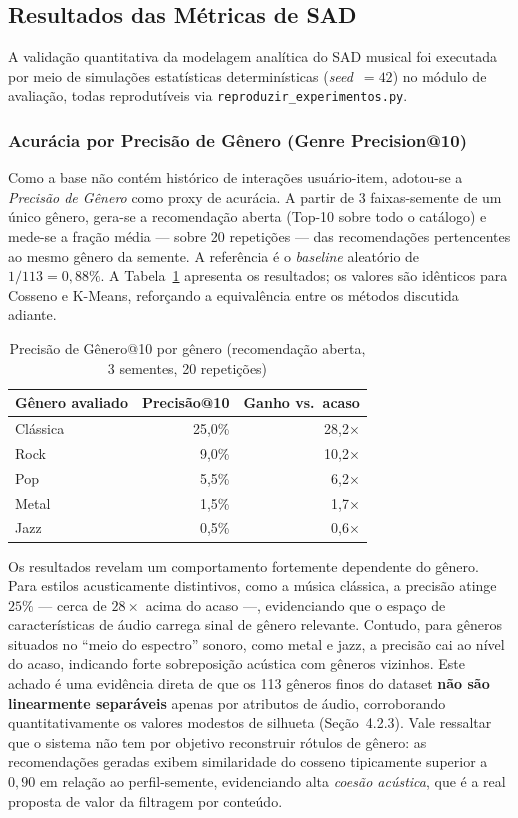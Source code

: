 \documentclass[12pt]{article}
\begin{document}
\subsection{Resultados das Métricas de SAD}
A validação quantitativa da modelagem analítica do SAD musical foi executada por meio de simulações estatísticas determinísticas (\textit{seed}~$=42$) no módulo de avaliação, todas reprodutíveis via \texttt{reproduzir\_experimentos.py}.

\subsubsection{Acurácia por Precisão de Gênero (Genre Precision@10)}
Como a base não contém histórico de interações usuário-item, adotou-se a \textit{Precisão de Gênero} como proxy de acurácia. A partir de 3 faixas-semente de um único gênero, gera-se a recomendação aberta (Top-10 sobre todo o catálogo) e mede-se a fração média --- sobre 20 repetições --- das recomendações pertencentes ao mesmo gênero da semente. A referência é o \textit{baseline} aleatório de $1/113 = 0,88\%$. A Tabela~\ref{tab:genreprec} apresenta os resultados; os valores são idênticos para Cosseno e K-Means, reforçando a equivalência entre os métodos discutida adiante.

\begin{table}[H]
\centering
\caption{Precisão de Gênero@10 por gênero (recomendação aberta, 3 sementes, 20 repetições)}
\label{tab:genreprec}
\begin{tabular}{lrr}
\toprule
\textbf{Gênero avaliado} & \textbf{Precisão@10} & \textbf{Ganho vs.\ acaso} \\
\midrule
Clássica & 25,0\% & 28,2$\times$ \\
Rock     & 9,0\%  & 10,2$\times$ \\
Pop      & 5,5\%  & 6,2$\times$ \\
Metal    & 1,5\%  & 1,7$\times$ \\
Jazz     & 0,5\%  & 0,6$\times$ \\
\bottomrule
\end{tabular}
\end{table}

Os resultados revelam um comportamento fortemente dependente do gênero. Para estilos acusticamente distintivos, como a música clássica, a precisão atinge $25\%$ --- cerca de $28\times$ acima do acaso ---, evidenciando que o espaço de características de áudio carrega sinal de gênero relevante. Contudo, para gêneros situados no ``meio do espectro'' sonoro, como metal e jazz, a precisão cai ao nível do acaso, indicando forte sobreposição acústica com gêneros vizinhos. Este achado é uma evidência direta de que os 113 gêneros finos do dataset \textbf{não são linearmente separáveis} apenas por atributos de áudio, corroborando quantitativamente os valores modestos de silhueta (Seção~4.2.3). Vale ressaltar que o sistema não tem por objetivo reconstruir rótulos de gênero: as recomendações geradas exibem similaridade do cosseno tipicamente superior a $0,90$ em relação ao perfil-semente, evidenciando alta \textit{coesão acústica}, que é a real proposta de valor da filtragem por conteúdo.
\end{document}
